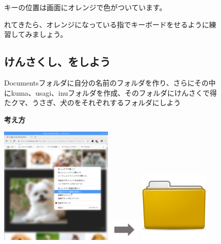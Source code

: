 \documentclass[a4paper,12pt]{jarticle}
\begin{document}
\begin{figure}[t]
{\begin{minipage}{5cm}
      \bigskip

      キーの位置は画面にオレンジで色がついています。


      \bigskip

      れてきたら、オレンジになっている指でキーボードをせるように練習してみましょう。


      \bigskip
    \end{minipage}
  }

  \bigskip
  \bigskip
  \bigskip
  \bigskip
\end{figure}
\clearpage
\begin{figure}[t]
  \subsection{\theExercise 
    けんさくし、をしよう}
  Documentsフォルダに自分の名前のフォルダを作り、さらにその中にkuma、usagi、inuフォルダを作成、そのフォルダにけんさくで得たクマ、うさぎ、犬のをそれぞれするフォルダにしよう

  \textbf{考え方}


  \bigskip




  \centering
  \begin{minipage}{\textwidth}
    \begin{minipage}{5.582cm}
      \includegraphics[width=5.413cm]{textbook-img092.png}
    \end{minipage}
    \begin{minipage}{3.582cm}
      \includegraphics[width=1.505cm]{textbook-img073.png}
    \end{minipage}
    \begin{minipage}{5.582cm}
      \includegraphics[width=3.387cm]{textbook-img044.png}
    \end{minipage}
  \end{minipage}



\end{figure}
\end{document}
